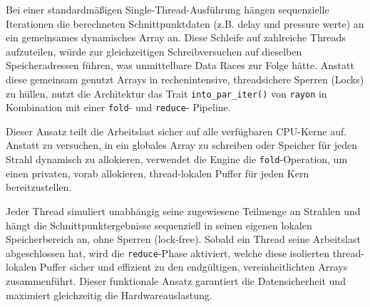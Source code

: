 \documentclass{article}
\begin{document}

    Bei einer standardmäßigen Single-Thread-Ausführung hängen sequenzielle Iterationen die berechneten Schnittpunktdaten (z.B. delay und pressure werte) an ein gemeinsames dynamisches Array an.
    Diese Schleife auf zahlreiche Threads aufzuteilen, würde zur gleichzeitigen Schreibversuchen auf dieselben Speicheradressen führen, was unmittelbare Data Races zur Folge hätte.
    Anstatt diese gemeinsam genutzt Arrays in rechenintensive, threadsichere Sperren (Locks) zu hüllen, nutzt die Architektur das Trait \texttt{into\_par\_iter()} von \texttt{rayon} in
    Kombination mit einer \texttt{fold}- und \texttt{reduce}- Pipeline.

    Dieser Ansatz teilt die Arbeitslast sicher auf alle verfügbaren CPU-Kerne auf.
    Anstatt zu versuchen, in ein globales Array zu schreiben oder Speicher für jeden Strahl
    dynamisch zu allokieren, verwendet die Engine die \texttt{fold}-Operation, um einen privaten, vorab allokieren, thread-lokalen Puffer für jeden Kern bereitzustellen.

    Jeder Thread simuliert unabhängig seine zugewiesene Teilmenge an Strahlen und hängt die Schnittpunktergebnisse sequenziell in seinen eigenen lokalen Speicherbereich an, ohne Sperren (lock-free).
    Sobald ein Thread seine Arbeitslast abgeschlossen hat, wird die \texttt{reduce}-Phase aktiviert, welche diese isolierten thread-lokalen Puffer sicher und effizient zu den endgültigen,
    vereinheitlichten Arrays zusammenführt.
    Dieser funktionale Ansatz garantiert die Datensicherheit und maximiert gleichzeitig die Hardwareauslastung.

\end{document}
